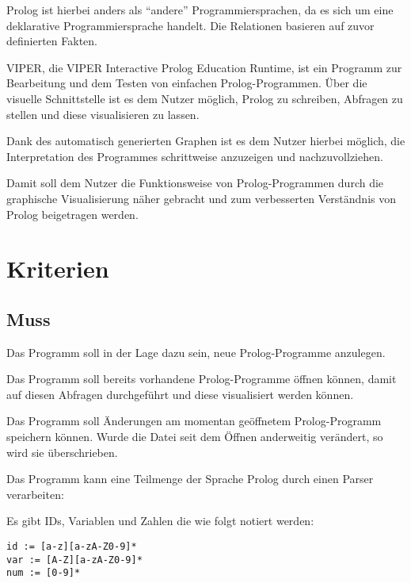 \documentclass[parskip=full,11pt,twoside]{scrartcl}
\begin{document}
Prolog ist hierbei anders als \enquote{andere} Programmiersprachen, da es sich um eine deklarative Programmiersprache handelt. Die Relationen basieren auf zuvor definierten Fakten.

VIPER, die VIPER Interactive Prolog Education Runtime, ist ein Programm zur Bearbeitung und dem Testen von einfachen Prolog-Programmen. Über die visuelle Schnittstelle ist es dem Nutzer möglich, Prolog zu schreiben, Abfragen zu stellen und diese visualisieren zu lassen.

Dank des automatisch generierten Graphen ist es dem Nutzer hierbei möglich, die Interpretation des Programmes schrittweise anzuzeigen und nachzuvollziehen.

Damit soll dem Nutzer die Funktionsweise von Prolog-Programmen durch die graphische Visualisierung näher gebracht und zum verbesserten Verständnis von Prolog beigetragen werden.

\pagebreak
\section{Kriterien}

\subsection{Muss}


Das Programm soll in der Lage dazu sein, neue Prolog-Programme anzulegen.


Das Programm soll bereits vorhandene Prolog-Programme öffnen können, damit auf diesen Abfragen durchgeführt und diese visualisiert werden können.


Das Programm soll Änderungen am momentan geöffnetem Prolog-Programm speichern können. Wurde die Datei seit dem Öffnen anderweitig verändert, so wird sie überschrieben.


Das Programm kann eine Teilmenge der Sprache Prolog durch einen Parser verarbeiten:

Es gibt IDs, Variablen und Zahlen die wie folgt notiert werden:

\begin{lstlisting}
id := [a-z][a-zA-Z0-9]*
var := [A-Z][a-zA-Z0-9]*
num := [0-9]*
\end{lstlisting}
\end{document}
